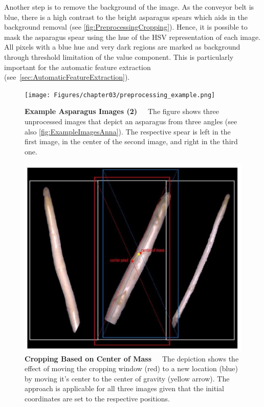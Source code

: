 Another step is to remove the background of the image. As the conveyor belt is blue, there is a high contrast to the bright asparagus spears which aids in the background removal (see \autoref{fig:PreprocessingCropping}). Hence, it is possible to mask the asparagus spear using the hue of the HSV representation of each image. All pixels with a blue hue and very dark regions are marked as background through threshold limitation of the value component. This is particularly important for the automatic feature extraction (see~\autoref{sec:AutomaticFeatureExtraction}).

\begin{figure}[!ht]
	\centering
	\texttt{[image: Figures/chapter03/preprocessing\_example.png]}
	\decoRule
	\caption[Example Asparagus Images (2)]{\textbf{Example Asparagus Images (2)}~~~The figure shows three unprocessed images that depict an asparagus from three angles (see also \autoref{fig:ExampleImagesAnna}). The respective spear is left in the first image, in the center of the second image, and right in the third one.}
	\label{fig:PreprocessingExamples}
\end{figure}

\begin{figure}[!ht]
	\centering
	\includegraphics[scale=0.4]{Figures/chapter03/preprocessing_cropping.png}
	\decoRule
	\caption[Cropping Based on Center of Mass]{\textbf{Cropping Based on Center of Mass}~~~The depiction shows the effect of moving the cropping window (red) to a new location (blue) by moving it's center to the center of gravity (yellow arrow). The approach is applicable for all three images given that the initial coordinates are set to the respective positions.}
	\label{fig:PreprocessingCropping}
\end{figure}

